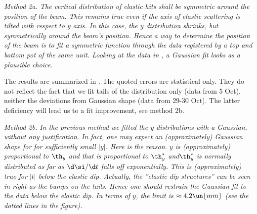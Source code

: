 \em{Method 2a}. The vertical distribution of elastic hits shall be symmetric around the position of the beam. This remains true even if the axis of elastic scattering is tilted with respect to $y$ axis. In this case, the $y$ distribution shrinks, but symmetrically around the beam's position. Hence a way to determine the position of the beam is to fit a symmetric function through the data registered by a top and bottom pot of the same unit. Looking at the data in , a Gaussian fit looks as a plausible choice. 

The results are summarized in . The quoted errors are statistical only. They do not reflect the fact that we fit tails of the distribution only (data from 5 Oct), neither the deviations from Gaussian shape (data from 29-30 Oct). The latter deficiency will lead us to a fit improvement, see method 2b.






\em{Method 2b}. In the previous method we fitted the $y$ distributions with a Gaussian, without any justification. In fact, one may expect an (approximately) Gaussian shape for for sufficiently small $|y|$. Here is the reason. $y$ is (approximately) proportional to $\th_y$ and that is proportional to $\th_y^*$ and$\th_y^*$ is normally distributed as far as $\d\si/\d t$ falls off exponentially. This is (approximately) true for $|t|$ below the elastic dip. Actually, the ''elastic dip structures'' can be seen in  right as the bumps on the tails. Hence one should restrain the Gaussian fit to the data below the elastic dip. In terms of $y$, the limit is $\approx 4.2\un{mm}$ (see the dotted lines in the figure).

